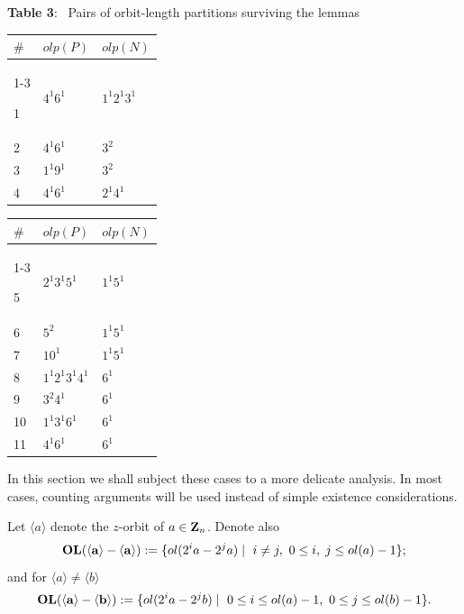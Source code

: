 {{\large{\bf Table 3}:{\normalsize
 \ Pairs of orbit-length partitions surviving the lemmas 
		 }
\begin{center}
{\small
\begin{tabular}{||l|l|l||}      \hline
  $\# $ &$olp(P)$               &$olp(N)$         \\ \cline{1-3}
     
     1  & $4^{1}6^{1}$          & $1^{1}2^{1}3^{1}$  \\ \hline 
     2  & $4^{1}6^{1}$          & $3^{2}$            \\ \hline 
     3  & $1^{1}9^{1}$          & $3^{2}$            \\ \hline 
     4  & $4^{1}6^{1}$          & $2^{1}4^{1}$       \\ \hline 
\end{tabular}
}
\end{center}

\begin{center}
{\small
\begin{tabular}{||l|l|l||}      \hline
  $\# $ &$olp(P)$               &$olp(N)$         \\ \cline{1-3}


     5  & $2^{1}3^{1}5^{1}$     & $1^{1}5^{1}$       \\ \hline 
     6  &$ 5^{2}$               & $1^{1}5^{1}$       \\ \hline 
     7  & $10^{1}$              & $1^{1}5^{1}$       \\ \hline 
     8  & $1^{1}2^{1}3^{1}4^{1}$ &  $6^{1}$          \\ \hline 
     9  &$ 3^{2}4^{1}$          &  $6^{1}$          \\ \hline 
     10 & $1^{1}3^{1}6^{1}$     &      $6^{1}$      \\ \hline   
     11 & $4^{1}6^{1}$          &      $6^{1}$      \\ \hline
    

\end{tabular}
}
\end{center}

\normalsize{
In this section we shall subject these cases to a more delicate analysis. In most cases, 
counting arguments will be used instead of simple existence considerations. 
 
Let $\langle a \rangle$ denote the $z$-orbit of $a \in {\bf Z}_n$. 
Denote also
$$ {\bf OL(\langle a \rangle - \langle a \rangle)} := \{ol(2^{i}a-2^{j}a) \mid \ i \neq j , \ 0 \leq i, \; j \leq ol(a)-1\};$$
and for $\langle a \rangle \neq \langle b \rangle$
$$ {\bf OL(\langle a \rangle - \langle b \rangle)} := \{ol(2^{i}a-2^{j}b) \mid \ 0 \leq i \leq ol(a)-1, \ 0 \leq j \leq ol(b)-1\}.$$ 

}}}

